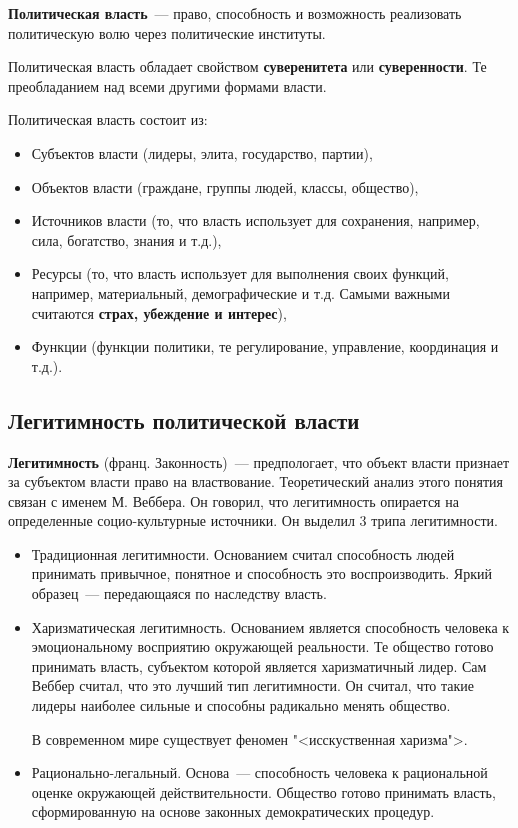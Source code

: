 \textbf{Политическая власть}~--- право, способность и возможность реализовать политическую волю через политические институты.

Политическая власть обладает свойством \textbf{суверенитета} или \textbf{суверенности}. Те преобладанием над всеми другими формами власти.

Политическая власть состоит из:
\begin{itemize}
	\item Субъектов власти (лидеры, элита, государство, партии),
	\item Объектов власти (граждане, группы людей, классы, общество),
	\item Источников власти (то, что власть использует для сохранения, например, сила, богатство, знания и т.д.),
	\item Ресурсы (то, что власть использует для выполнения своих функций, например, материальный, демографические и т.д. Самыми важными считаются \textbf{страх, убеждение и интерес}),
	\item Функции (функции политики, те регулирование, управление, координация и т.д.).
\end{itemize}


\subsection{Легитимность политической власти}
\textbf{Легитимность} (франц. Законность)~--- предпологает, что объект власти признает за субъектом власти право на властвование. Теоретический анализ этого понятия связан с именем М. Веббера. Он говорил, что легитимность опирается на определенные социо-культурные источники. Он выделил 3 трипа легитимности.
\begin{itemize}
	\item Традиционная легитимности. Основанием считал способность людей принимать привычное, понятное и способность это воспроизводить. Яркий образец~--- передающаяся по наследству власть.
	\item Харизматическая легитимность. Основанием является способность человека к эмоциональному восприятию окружающей реальности. Те общество готово принимать власть, субъектом которой является харизматичный лидер. Сам Веббер считал, что это лучший тип легитимности. Он считал, что такие лидеры наиболее сильные и способны радикально менять общество.
	
	В современном мире существует феномен "<исскуственная харизма">.
	\item Рационально-легальный. Основа~--- способность человека к рациональной оценке окружающей действительности. Общество готово принимать власть, сформированную на основе законных демократических процедур.
\end{itemize}

